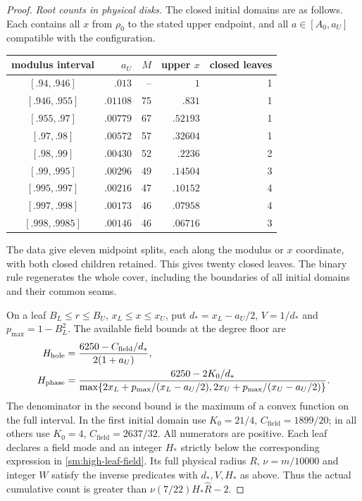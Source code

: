\documentclass[11pt,reqno]{amsart}
\numberwithin{equation}{section}
\theoremstyle{definition}
\theoremstyle{remark}
\begin{document}
\begin{proof}
\smallskip\noindent\emph{Root counts in physical disks.}
The closed initial domains are as follows. Each contains
all $x$ from $\rho_0$ to the stated upper endpoint, and all
$a\in[A_0,a_U]$ compatible with the configuration.
\begin{center}\small
\begin{tabular}{crrrr}
\toprule
modulus interval&$a_U$&$M$&upper $x$&closed leaves\\\midrule
$[.94,.946]$&$.013$&--&$1$&1\\
$[.946,.955]$&$.01108$&75&$.831$&1\\
$[.955,.97]$&$.00779$&67&$.52193$&1\\
$[.97,.98]$&$.00572$&57&$.32604$&1\\
$[.98,.99]$&$.00430$&52&$.2236$&2\\
$[.99,.995]$&$.00296$&49&$.14504$&3\\
$[.995,.997]$&$.00216$&47&$.10152$&4\\
$[.997,.998]$&$.00173$&46&$.07958$&4\\
$[.998,.9985]$&$.00146$&46&$.06716$&3\\\bottomrule
\end{tabular}
\end{center}
The data give eleven midpoint splits, each along the modulus or
$x$ coordinate, with both closed children retained. This gives
twenty closed leaves. The binary rule regenerates the whole cover,
including the boundaries of all initial domains and their common seams.

On a leaf $B_L\le r\le B_U$, $x_L\le x\le x_U$, put
$d_*=x_L-a_U/2$, $V=1/d_*$ and $p_{\max}=1-B_L^2$.
The available field bounds at the degree floor are
\begin{align}
 H_{\mathrm{hole}}&=\frac{6250-C_{\mathrm{field}}/d_*}{2(1+a_U)},\notag\\
 H_{\mathrm{phase}}&=\frac{6250-2K_0/d_*}
 {\max\{2x_L+p_{\max}/(x_L-a_U/2),
          2x_U+p_{\max}/(x_U-a_U/2)\}}.
 \label{sm:high-leaf-field}
\end{align}
The denominator in the second bound is the maximum of a convex
function on the full interval. In the first initial domain use
$K_0=21/4$, $C_{\mathrm{field}}=1899/20$; in all others use
$K_0=4$, $C_{\mathrm{field}}=2637/32$.
All numerators are positive. Each leaf declares a field mode and an
integer $H_*$ strictly below the corresponding expression in
\eqref{sm:high-leaf-field}.
Its full physical radius $R$, $\nu=m/10000$ and integer $W$
satisfy the inverse predicates with $d_*,V,H_*$ as above.
Thus the actual cumulative count is greater than
$\nu(7/22)H_*\widehat R-2$.


\end{proof}
\end{document}
